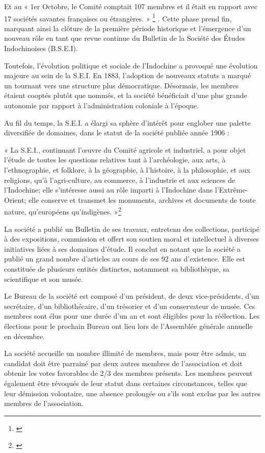 Et au « 1er Octobre, le Comité comptait 107 membres et il était en rapport avec 17 sociétés savantes françaises ou étrangères. » \footnote{\cite{a}} . Cette phase prend fin, marquant ainsi la clôture de la première période historique et l'émergence d'un nouveau rôle en tant que revue continue du Bulletin de la Société des Études Indochinoises (B.S.E.I).

Toutefois, l'évolution politique et sociale de l'Indochine a provoqué une évolution majeure au sein de la S.E.I. En 1883, l'adoption de nouveaux statuts a marqué un tournant vers une structure plus démocratique. Désormais, les membres étaient cooptés plutôt que nommés, et la société bénéficiait d'une plus grande autonomie par rapport à l'administration coloniale à l'époque. 

Au fil du temps, la S.E.I. a élargi sa sphère d'intérêt pour englober une palette diversifiée de domaines, dans le statut de la société publiée année 1906 : 

« La S.E.I., continuant l'œuvre du Comité agricole et industriel, a pour objet l'étude de toutes les questions relatives tant à l'archéologie, aux arts, à l'ethnographie, et folklore, à la géograpbie, à l'histoire, à la philosophie, et aux religions, qu'à l'agri-culture, au commerce, à l'industrie et aux sciences de l'Indochine; elle s'intéresse aussi au rôle imparti à l'Indochine dans l'Extrême-Orient; elle conserve et transmet les monuments, archives et documents de toute nature, qu'européens qu'indigènes. »\footnote{\cite{bseik}}

La société a publié un Bulletin de ses travaux, entretenu des collections, participé à des expositions, commission et offert son soutien moral et intellectuel à diverses initiatives liées à ses domaines d'étude. Il conclut en notant que la société a publié un grand nombre d'articles au cours de ses 92 ans d'existence. Elle est constituée de plusieurs entités distinctes, notamment sa bibliothèque, sa scientifique et son musée.

Le Bureau de la société est composé d'un président, de deux vice-présidents, d'un secrétaire, d'un bibliothécaire, d'un trésorier et d'un conservateur de musée. Ces membres sont élus pour une durée d'un an et sont éligibles pour la réélection. Les élections pour le prochain Bureau ont lieu lors de l'Assemblée générale annuelle en décembre.

La société accueille un nombre illimité de membres, mais pour être admis, un candidat doit être parrainé par deux autres membres de l'association et doit obtenir les votes favorables de 2/3 des membres présents. Les membres peuvent également être révoqués de leur statut dans certaines circonstances, telles que leur démission volontaire, une absence prolongée ou s'ils sont exclus par les autres membres de l'association.

